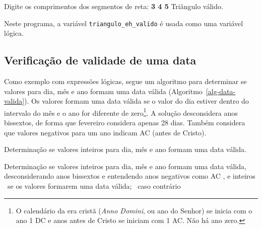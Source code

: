 \documentclass[
  11pt,
  a4paper,
]{scrbook}
\newenvironment{Shaded}{\begin{snugshade}}{\end{snugshade}}
\newcommand{\KeywordTok}[1]{\textcolor[rgb]{0.13,0.29,0.53}{\textbf{#1}}}
\newcommand{\NormalTok}[1]{#1}
\begin{document}
\begin{Shaded}
\begin{Highlighting}[]
\NormalTok{Digite os comprimentos dos segmentos de reta: }\KeywordTok{ 3 4 5 }
\NormalTok{Triângulo válido.}
\end{Highlighting}
\end{Shaded}

Neste programa, a variável \texttt{triangulo\_eh\_valido} é usada como
uma variável lógica.

\subsection{Verificação de validade de uma
data}\label{verificauxe7uxe3o-de-validade-de-uma-data}

Como exemplo com expressões lógicas, segue um algoritmo para determinar
se valores para dia, mês e ano formam uma data válida
(Algoritmo~\ref{alg-data-valida}). Os valores formam uma data válida se
o valor do dia estiver dentro do intervalo do mês e o ano for diferente
de zero\footnote{O calendário da era cristã (\emph{Anno Domini}, ou ano
  do Senhor) se inicia com o ano 1 DC e anos antes de Cristo se iniciam
  com 1 AC. Não há ano zero.}. A solução desconsidera anos bissextos, de
forma que fevereiro considera apenas 28 dias. Também considera que
valores negativos para um ano indicam AC (antes de Cristo).

\begin{algorithm}
\caption{\label{alg-data-valida}Determinação se valores inteiros para
dia, mês e ano formam uma data válida.}
\begingroup%


\begin{algorithmic}
    \Description Determinação se valores inteiros para dia, mês e ano formam uma data válida, desconsiderando anos bissextos e entendendo anos negativos como AC
    \Require {},  e  inteiros
    \Ensure \True\ se os valores formarem uma data válida; \False\ caso contrário
    \Statex{}
\end{algorithmic}

\endgroup
\end{algorithm}
\end{document}
